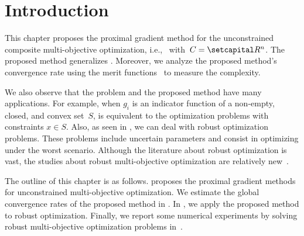 \documentclass[../main]{subfiles}
\begin{document}
\section{Introduction} 
This chapter proposes the proximal gradient method for the unconstrained composite multi-objective optimization, i.e.,~ with~$C = \setR^n$.
The proposed method generalizes .
Moreover, we analyze the proposed method's convergence rate using the merit functions~ to measure the complexity.

We also observe that the problem and the proposed method have many applications.
For example, when $g_i$ is an indicator function of a non-empty, closed, and convex set~$S$,  is equivalent to the optimization problems with constraints $x \in S$.
Also, as seen in , we can deal with robust optimization problems. These problems include uncertain parameters and consist in optimizing under the worst scenario. Although the literature about robust optimization is vast, the studies about robust multi-objective optimization are relatively new~\cite{Ehrgott2014,Fliege2014,Morishita2016}.

The outline of this chapter is as follows.
 proposes the proximal gradient methods for unconstrained multi-objective optimization.
We estimate the global convergence rates of the proposed method in .
In , we apply the proposed method to robust optimization.
Finally, we report some numerical experiments by solving robust multi-objective optimization problems in~.
\end{document}
